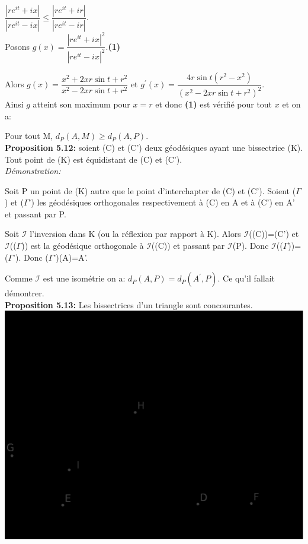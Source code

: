 \documentclass[a4paper, 12pt, twoside]{book}
\begin{document}
 $\dfrac{|re^{it}+ix|}{|re^{it}-ix|}\leq \dfrac{|re^{it}+ir|}{|re^{it}-ir|}$.\\
 
 Posons $g(x)=\dfrac{|re^{it}+ix|^{2}}{|re^{it}-ix|^{2}}$.\textbf{(1)}\
 
 Alors $g(x)=\dfrac{x^{2}+2xr \sin t+r^{2}}{x^{2}-2xr \sin t+r^{2}}$ et $g^{'}(x)=\dfrac{4r \sin t(r^{2}-x^{2})}{(x^{2}-2xr \sin t+r^{2})^{2}}$.\\
 
 Ainsi $g$ atteint son maximum pour $x=r$ et donc \textbf{(1)} est vérifié pour tout $x$ et on a:\
 
 Pour tout M,  $d_{P}(A,M)\geq d_{P}(A,P)$.\\
 
 
 
 \textbf{Proposition 5.12:} soient (C) et (C') deux géodésiques ayant une bissectrice (K). Tout point de (K) est équidistant de (C) et (C').\\
 
 \textit{Démonstration:} 
 
 Soit P un point de (K) autre que le point d'interchapter de (C) et (C'). Soient ($\Gamma$) et  ($\Gamma$') les géodésiques orthogonales respectivement à (C) en A et à (C') en A' et passant par P.\
 
 Soit $\mathcal{I}$ l'inversion dans K (ou la réflexion par rapport à K). Alors $\mathcal{I}$((C))=(C') et $\mathcal{I}$(($\Gamma$)) est la géodésique orthogonale à $\mathcal{I}$((C)) et passant par $\mathcal{I}$(P). Donc $\mathcal{I}$(($\Gamma$))=($\Gamma$'). Donc ($\Gamma$')(A)=A'. \
 
 Comme  $\mathcal{I}$ est une isométrie on a: $d_{P}(A,P)=d_{P}(A^{'},P)$. Ce qu'il fallait démontrer.\\
 
 
 
 
 
 
 
 
 
 \textbf{Proposition 5.13:} Les bissectrices d'un triangle sont concourantes.\\
 
 \includegraphics[scale=0.7]{figures/hyper41.eps}\\
\end{document}
